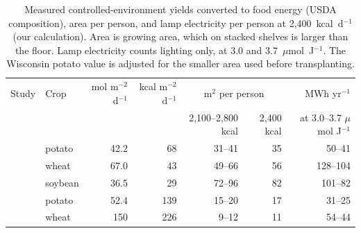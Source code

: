 \begin{table}[H]
\centering
\caption{Measured controlled-environment yields converted to food energy (USDA composition), area per person, and lamp electricity per person at 2{,}400~kcal~d$^{-1}$ (our calculation). Area is growing area, which on stacked shelves is larger than the floor. Lamp electricity counts lighting only, at 3.0 and 3.7~$\mu$mol~J$^{-1}$. The Wisconsin potato value is adjusted for the smaller area used before transplanting.}
\label{tab:nutrition-ce}
\begin{tabular}{llrrrrr}
\toprule
Study & Crop & mol m$^{-2}$ d$^{-1}$ & kcal m$^{-2}$ d$^{-1}$ & \multicolumn{2}{c}{m$^2$ per person} & MWh yr$^{-1}$ \\
 & & & & 2{,}100--2{,}800 kcal & 2{,}400 kcal & at 3.0--3.7 $\mu$mol J$^{-1}$ \\
\midrule
\cite{wheeler2008crop} & potato & 42.2 & 68 & 31--41 & 35 & 50--41 \\
\cite{wheeler2008crop} & wheat & 67.0 & 43 & 49--66 & 56 & 128--104 \\
\cite{wheeler2008crop} & soybean & 36.5 & 29 & 72--96 & 82 & 101--82 \\
\cite{wheeler2006potato} & potato & 52.4 & 139 & 15--20 & 17 & 31--25 \\
\cite{bugbee1988limits} & wheat & 150 & 226 & 9--12 & 11 & 54--44 \\
\bottomrule
\end{tabular}
\end{table}


